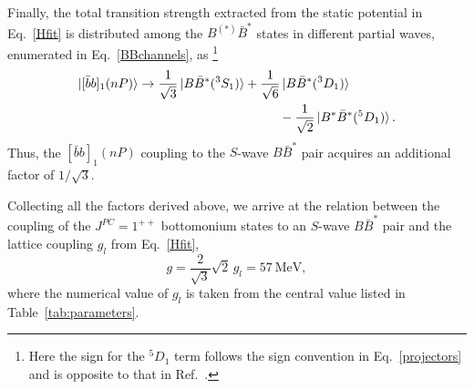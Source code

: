 \documentclass[aps,prd,showpacs,amsmath,twocolumn,superscriptaddress,floatfix,nofootinbib,notitlepage]{revtex4-2}
\newcommand{\bbnP}{[\bar{b}b]_1(nP)}
\newcommand{\be}{\begin{equation}}
\newcommand{\ee}{\end{equation}}
\begin{document}
Finally, the total transition strength extracted from the static potential in Eq.~\eqref{Hfit} is distributed among the $B^{(*)}\bar{B}^*$ states in different partial waves, enumerated in Eq.~\eqref{BBchannels}, as \cite{Baru:2016iwj,Bruschini:2023zkb}\footnote{Here the sign for the $^5D_1$ term follows the sign convention in Eq.~\eqref{projectors} and is opposite to that in Ref.~\cite{Bruschini:2023zkb}.}
\be
\begin{split}
\ket{\bbnP}&\to\frac{1}{\sqrt{3}}\ket{B\bar{B}^*(^3S_1)}
+\frac{1}{\sqrt{6}}\ket{B\bar{B}^*(^3D_1)}\\&\hspace*{0.32\columnwidth}-
\frac{1}{\sqrt{2}}\ket{B^*\bar{B}^*(^5D_1)}.
\end{split}
\label{eq:PWdecomp}
\ee
Thus, the $\bbnP$ coupling to the $S$-wave $B\bar{B}^*$ pair acquires an additional factor of $1/\sqrt{3}$.

Collecting all the factors derived above, we arrive at the relation between the coupling of the $J^{PC}=1^{++}$ bottomonium states to an $S$-wave $B\bar{B}^*$ pair and the lattice coupling $g_l$ from Eq.~\eqref{Hfit},
\be
g=\frac{2}{\sqrt{3}}\sqrt{2}\, g_l= 57~\mbox{MeV},
\label{g}
\ee
where the numerical value of $g_l$ is taken from the central value listed in Table~\ref{tab:parameters}.
\end{document}
